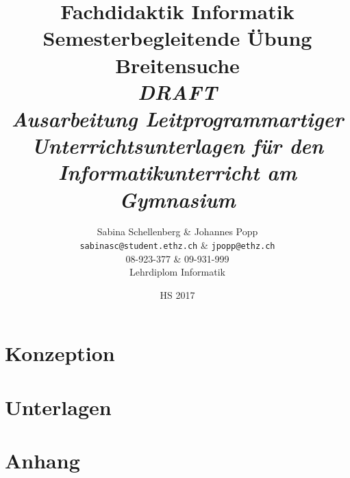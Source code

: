 \documentclass[12pt,a4paper,titlepage]{report}
\theoremstyle{definition}
\begin{document}
\title{
\textbf{Fachdidaktik Informatik} \\ 
\vspace{0cm} 
\Large Semesterbegleitende Übung  \\ 
\vspace{4cm} 
\huge \textbf{Breitensuche} \\ 
\huge{\emph{DRAFT}} \\
\vspace{1cm} 
\large \emph{Ausarbeitung Leitprogrammartiger Unterrichtsunterlagen für den Informatikunterricht am Gymnasium} 
\vspace{4cm}
}

\author{Sabina Schellenberg \& Johannes Popp \\ \texttt{sabinasc@student.ethz.ch} \& \texttt{jpopp@ethz.ch} \\ 08-923-377 \& 09-931-999 \\ Lehrdiplom Informatik}
\date{HS 2017}
\maketitle
\tableofcontents
\setcounter{page}{2}


\chapter{Konzeption}






\chapter{Unterlagen}










%
%
%
%
%
%
%
%
%
%
%
%
%
%




%



\chapter{Anhang}

%


%
\end{document}
